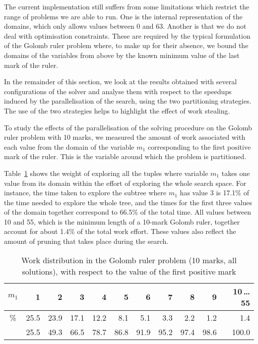 \documentclass{llncs}
\begin{document}
The current implementation still suffers from some limitations which
restrict the range of problems we are able to run. One is the internal
representation of the domains, which only allows values between 0 and
63. Another is that we do not deal with optimisation constraints.
These are required by the typical formulation of the Golomb ruler
problem where, to make up for their absence, we bound the domains of
the variables from above by the known minimum value of the last mark
of the ruler.

In the remainder of this section, we look at the results obtained with
several configurations of the solver and analyse them with respect to
the speedups induced by the parallelisation of the search, using the
two partitioning strategies. The use of the two strategies helps to
highlight the effect of work stealing.

To study the effects of the parallelisation of the solving procedure
on the Golomb ruler problem with 10 marks, we measured the amount of
work associated with each value from the domain of the variable $m_1$
corresponding to the first positive mark of the ruler. This is the
variable around which the problem is partitioned.

Table~\ref{tab:golomb:work} shows the weight of exploring all the
tuples where variable $m_1$ takes one value from its domain within the
effort of exploring the whole search space. For instance, the time
taken to explore the subtree where $m_1$ has value 3 is 17.1\% of the
time needed to explore the whole tree, and the times for the first
three values of the domain together correspond to 66.5\% of the total
time. All values between 10 and 55, which is the minimum length of a
10-mark Golomb ruler, together account for about 1.4\% of the total
work effort. These values also reflect the amount of pruning that
takes place during the search.

\begin{table}[ht]
  \centering
  \caption{Work distribution in the Golomb ruler problem (10 marks, all
    solutions), with respect to the value of the first positive mark}
  \label{tab:golomb:work}
  \begin{tabular}{c|*{10}{r|}}
$m_1$ & 1    & 2    & 3    & 4    & 5    & 6    & 7    & 8    & 9    & 10\,\ldots 55 \\ \hline
    \%    & 25.5 & 23.9 & 17.1 & 12.2 &  8.1 &  5.1 &  3.3 &  2.2 &  1.2 &   1.4         \\ \hline
          & 25.5 & 49.3 & 66.5 & 78.7 & 86.8 & 91.9 & 95.2 & 97.4 & 98.6 & 100.0         \\ \cline{2-11}
  \end{tabular}
\end{table}
\end{document}
